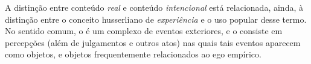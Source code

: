 A distinção entre conteúdo \emph{real} e conteúdo
  \emph{intencional} está relacionada, ainda, à
  distinção entre o conceito husserliano de
  \emph{experiência} e o uso popular desse termo.
No sentido comum, o  é um
  complexo de eventos exteriores, e o
   consiste em percepções (além
  de julgamentos e outros atos) nas quais tais
  eventos aparecem como objetos, e objetos
  frequentemente relacionados ao ego empírico.

